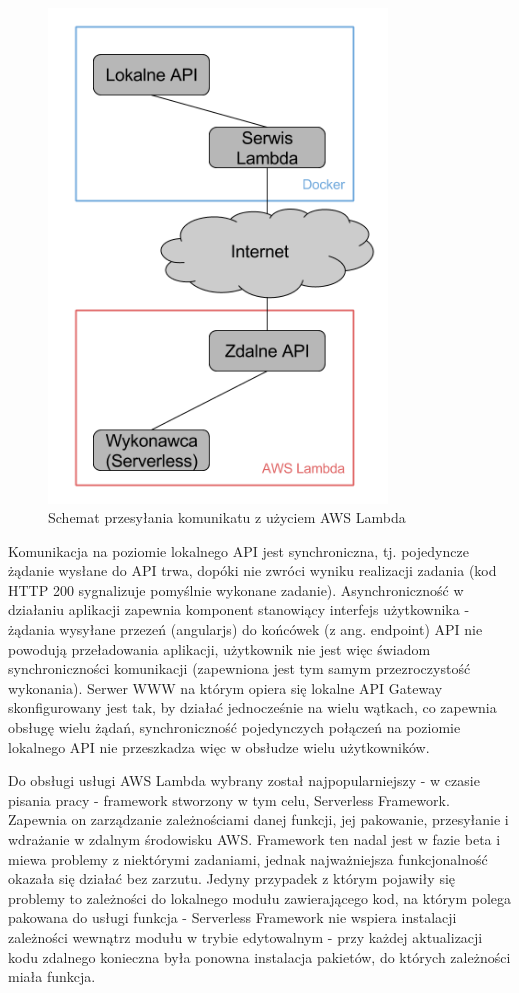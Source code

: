 \documentclass[oneside]{mgr}
\begin{document}
\begin{figure}
	\centering
	\includegraphics[width=9cm]{app_lambda_architecture}
	\caption{Schemat przesyłania komunikatu z użyciem AWS Lambda}
	\label{fig:AppLambdaCommunicationsScheme}
\end{figure}

Komunikacja na poziomie lokalnego API jest synchroniczna, tj. pojedyncze żądanie wysłane do API trwa, dopóki nie zwróci wyniku realizacji zadania (kod HTTP 200 sygnalizuje pomyślnie wykonane zadanie). Asynchroniczność w działaniu aplikacji zapewnia komponent stanowiący interfejs użytkownika - żądania wysyłane przezeń (angularjs) do końcówek (z ang. endpoint) API nie powodują przeładowania aplikacji, użytkownik nie jest więc świadom synchroniczności komunikacji (zapewniona jest tym samym przezroczystość wykonania). Serwer WWW na którym opiera się lokalne API Gateway skonfigurowany jest tak, by działać jednocześnie na wielu wątkach, co zapewnia obsługę wielu żądań, synchroniczność pojedynczych połączeń na poziomie lokalnego API nie przeszkadza więc w obsłudze wielu użytkowników.

Do obsługi usługi AWS Lambda wybrany został najpopularniejszy - w czasie pisania pracy - framework stworzony w tym celu, Serverless Framework. Zapewnia on zarządzanie zależnościami danej funkcji, jej pakowanie, przesyłanie i wdrażanie w zdalnym środowisku AWS. Framework ten nadal jest w fazie beta i miewa problemy z niektórymi zadaniami, jednak najważniejsza funkcjonalność okazała się działać bez zarzutu. Jedyny przypadek z którym pojawiły się problemy to zależności do lokalnego modułu zawierającego kod, na którym polega pakowana do usługi funkcja - Serverless Framework nie wspiera instalacji zależności wewnątrz modułu w trybie edytowalnym - przy każdej aktualizacji kodu zdalnego konieczna była ponowna instalacja pakietów, do których zależności miała funkcja.
\end{document}
